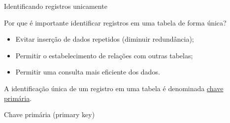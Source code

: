\documentclass[xcolor=x11names,compress]{beamer}
\begin{document}
\begin{frame}{Identificando registros unicamente}

Por que é importante identificar registros em uma tabela de forma única?

\begin{itemize}
\itemsep 5mm

\item Evitar inserção de dados repetidos (diminuir redundância);

\item Permitir o estabelecimento de relações com outras tabelas;

\item Permitir uma consulta mais eficiente dos dados.

\end{itemize}

\begin{block}{}
\centering A identificação única de um registro em uma tabela é denominada \underline{chave primária}.
\end{block}

\end{frame}

\begin{frame}{Chave primária (primary key)}


\end{frame}
\end{document}
